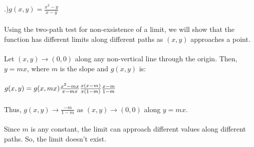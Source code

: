 \documentclass[12pt]{article}
\begin{document}
.)$g(x,y) = \frac{x^{2}-y}{x -y}$\\\\
\noindent Using the two-path test for non-exsistence of a limit, we will show that the function has different limits along different paths as $(x,y)$ approaches a point.\\\\
\noindent Let $(x, y) \to (0,0)$ along any non-vertical line through the origin. 
\noindent Then, $y = mx$, where $m$ is the slope and $g(x,y)$ is:\\\\
$g(x,y) = g(x,mx)
\\\\\frac{x^{2} - mx}{x-mx}
\\\\\frac{x(x-m)}{x(1-m)}
\\\\\frac{x-m}{1-m}$\\\\
\noindent Thus, $g(x,y) \to \frac{-m}{1-m}$ as $(x,y)\to(0,0)$ along $y = mx$.\\\\
\noindent Since $m$ is any constant, the limit can approach different values along different paths. So, the limit doesn't exist.\\\\
\end{document}
